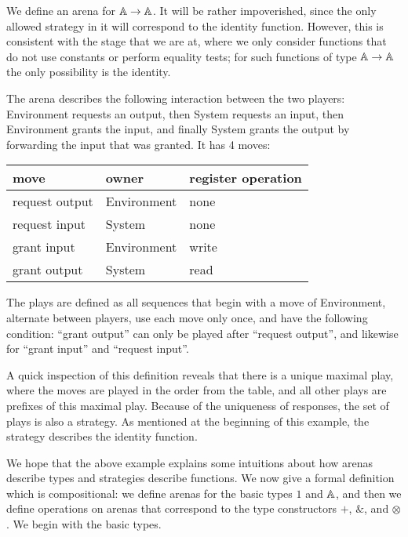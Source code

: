 \documentclass[a4paper,UKenglish,cleveref, autoref, numberwithinsect, thm-restate]{lipics-v2021}
\begin{document}
\begin{example}\label{ex:identity-function-without-equality-tests-and-constants}
    We define an arena for $\mathbb A \to \mathbb A$. It will be rather impoverished, since the  only allowed strategy in it will correspond to the identity function. However, this is consistent with the stage that we are at, where we only consider functions that do not use constants or perform equality tests; for such functions of type $\mathbb A\to\mathbb A$ the only possibility is the identity.

     The arena describes the following interaction between the two players: Environment  requests an output, then System requests an input, then Environment grants the input, and finally System grants the output by forwarding the input that was granted. It has 4 moves:
    \begin{center}
        \begin{tabular}{lll}
         move & owner & register operation \\
            \hline
            request output & Environment & none \\
            request input & System & none \\
            grant input & Environment & write \\
            grant output & System & read 
        \end{tabular}    
    \end{center}
    The plays are defined as all sequences that begin with a move of Environment, alternate between players, use each move only once, and have the following condition:  ``grant output'' can only be played after ``request output'', and likewise for ``grant input'' and ``request input''.  

    A quick inspection of this definition reveals that there is a unique maximal play, where the moves are played in the order from the table, and all other plays are prefixes of this maximal play. Because of the uniqueness of responses, the set of plays is also a strategy. As mentioned at the beginning of this example, the strategy describes the identity function.  \exampleend
\end{example}

We hope that the above example explains some intuitions about how arenas describe types and strategies describe functions. We now give a formal definition which is compositional: we define arenas for the basic types $1$ and $\mathbb A$, and then we define operations on arenas that correspond to the type constructors  $+$, $\&$, and $\otimes$. We begin with the basic types.
\end{document}
